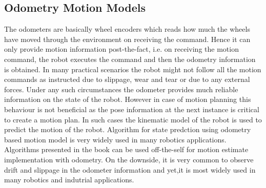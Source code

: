 \subsection{Odometry Motion Models}
The odometers are basically wheel encoders which reads how much the wheels have moved through the environment on receiving the command. Hence it can only provide motion information post-the-fact,
i.e. on receiving the motion command, the robot executes the command and then the odometry information is obtained. In many practical scenarios the robot might not follow all the motion commands as 
instructed due to slippage, wear and tear or due to any external forces. Under any such circumstances the odometer 
provides much reliable information on the state of the robot. However 
in case of motion planning this behaviour is not beneficial as the pose information at the next instance is critical to create a motion plan. In such cases the kinematic model of the 
robot is used to predict the motion of the robot. 
Algorithm for state predction using odometry based motion model is very widely used in many robotics applications. Algorithms presented in the book \cite{Thrun98aprobabilistic} can be used off-the-self 
for motion estimate implementation with odometry.
On the downside, it is very common to observe drift and slippage in the odometer information and yet,it is most widely used in many robotics and indutrial applications.

